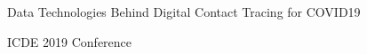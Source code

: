 \documentclass[11pt]{article}
\begin{document}
\begin{bulletin}
\begin{articlesection}{Data Technologies Behind Digital Contact Tracing for COVID19}
\end{articlesection}








\begin{callsection}
%
%
\begin{call}{ICDE 2019 Conference}
\end{call}
\end{callsection}

\end{bulletin}
\end{document}
